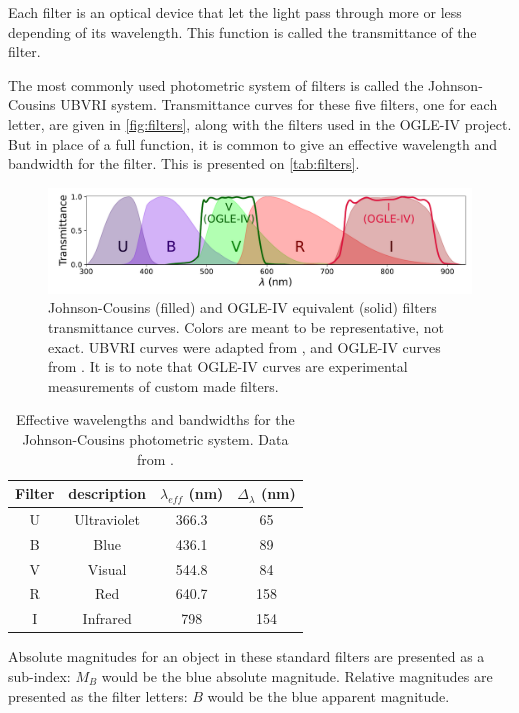 	Each filter is an optical device that let the light pass through more or less depending of its wavelength.
	This function is called the transmittance of the filter. 
	
	The most commonly used photometric system of filters is called the Johnson-Cousins UBVRI system. 
	Transmittance curves for these five filters, one for each letter, are given in \autoref{fig:filters},
	along with the filters used in the OGLE-IV project. 
	But in place of a full function, it is common to give an effective wavelength and bandwidth for the filter. 
	This is presented on \autoref{tab:filters}.
	
	\begin{figure}[H]
		\centering
		\includegraphics[width=\textwidth]{img/filters.pdf}
		\caption[Johnson-Cousins and OGLE-IV photometric systems]{
			Johnson-Cousins (filled) and OGLE-IV equivalent (solid) filters transmittance curves. 
			Colors are meant to be representative, not exact. UBVRI curves were adapted from \cite{Bessell2005}, and OGLE-IV curves from \cite{OGLE2015}. 
			It is to note that OGLE-IV curves are experimental measurements of custom made filters.
		}
		\label{fig:filters}
	\end{figure}
	
	\begin{table}
		\centering
		\begin{tabular}{c|c||c|c}
			Filter & description & $\lambda_{eff}$ (nm) & $\Delta_{\lambda}$ (nm) \\ \hline\hline
			U & Ultraviolet & 366.3 & 65 \\ 
			B & Blue & 436.1 & 89 \\ 
			V & Visual & 544.8 & 84 \\ 
			R & Red & 640.7 & 158 \\ 
			I & Infrared & 798 & 154
		\end{tabular}
		\caption[Johnson-Cousins effective wavelengths and bandwidths]{
			Effective wavelengths and bandwidths for the Johnson-Cousins photometric system. Data from \cite{Bessell2005}.
			}
		\label{tab:filters}
	\end{table}
	
	Absolute magnitudes for an object in these standard filters are presented as a sub-index: $M_B$ would be the blue absolute magnitude.
	Relative magnitudes are presented as the filter letters: $B$ would be the blue apparent magnitude.
	

